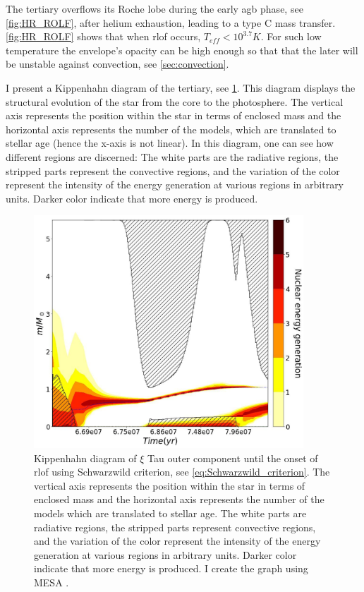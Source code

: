 The tertiary overflows its Roche lobe during the early \ac{agb} phase, see \cref{fig:HR_ROLF}, after helium exhaustion, leading to a type C mass transfer. \cref{fig:HR_ROLF} shows that when \ac{rlof} occurs, $T_{eff} < 10^{3.7} K$. For such low temperature the envelope's opacity can be high enough so that that the later will be unstable against convection, see \cref{sec:convection}. 

I present a Kippenhahn diagram of the tertiary, see \cref{fig:kippen_plot}. This diagram displays the structural evolution of the star from the core to the photosphere. The vertical axis represents the position within the star in terms of enclosed mass and the horizontal axis represents the number of the models, which are translated to stellar age (hence the x-axis is not linear). In this diagram, one can see how different regions are discerned: The white parts are the radiative regions, the stripped parts represent the convective regions, and the variation of the color represent the intensity of the energy generation at various regions in arbitrary units. Darker color indicate that more energy is produced.
\begin{figure}[H]
    \centering
    \includegraphics[width=0.9\textwidth]{Thesis/graphs/Kippen_ROLF_Schw.pdf}
    \caption{Kippenhahn diagram of $\xi$ Tau outer component until the onset of \ac{rlof} using Schwarzwild criterion, see \cref{eq:Schwarzwild_criterion}. The vertical axis represents the position within the star in terms of enclosed mass and the horizontal axis represents the number of the models which are translated to stellar age. The white parts are radiative regions, the stripped parts represent convective regions, and the variation of the color represent the intensity of the energy generation at various regions in arbitrary units. Darker color indicate that more energy is produced. I create the graph using MESA \citep{paxton2010modules,paxton2013modules,paxton2015modules,paxton2019modules}.}
    \label{fig:kippen_plot}
\end{figure}
